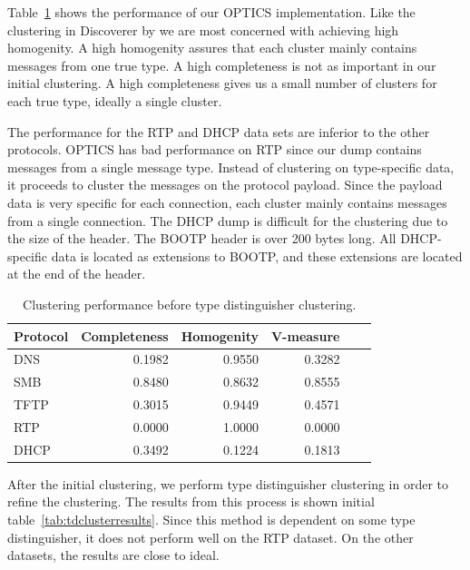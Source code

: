 \documentclass[a4paper]{report}
\begin{document}
Table~\ref{tab:initclusterresults} shows the performance of our OPTICS
implementation. Like the clustering in Discoverer by \citeauthor{cui07} we
are most concerned with achieving high homogenity. A high homogenity assures
that each cluster mainly contains messages from one true type. A high
completeness is not as important in our initial clustering. A high completeness
gives us a small number of clusters for each true type, ideally a single
cluster.

The performance for the RTP and DHCP data sets are inferior to the other
protocols. OPTICS has bad performance on RTP since our dump contains messages
from a single message type. Instead of clustering on type-specific data, it
proceeds to cluster the messages on the protocol payload. Since the payload
data is very specific for each connection, each cluster mainly contains
messages from a single connection. The DHCP dump is difficult for the
clustering due to the size of the header. The BOOTP header is over 200 bytes
long. All DHCP-specific data is located as extensions to BOOTP, and these
extensions are located at the end of the header.

\begin{table}[h]
    \centering
    \captionsetup{width=0.8\textwidth}
    \caption{Clustering performance before type distinguisher clustering.}
    \begin{tabular}{| l | r | r | r | r | r |}
        \hline
        \textbf{Protocol}&\textbf{Completeness}&\textbf{Homogenity}&\textbf{V-measure} \\ \hline
        DNS & 0.1982 & 0.9550 & 0.3282 \\ \hline
        SMB & 0.8480 & 0.8632 & 0.8555 \\ \hline
        TFTP & 0.3015 & 0.9449 & 0.4571 \\ \hline
        RTP & 0.0000 & 1.0000 & 0.0000 \\ \hline
        DHCP & 0.3492 & 0.1224 & 0.1813 \\ \hline
    \end{tabular}
    \label{tab:initclusterresults}
\end{table}

After the initial clustering, we perform type distinguisher clustering in order
to refine the clustering. The results from this process is shown initial
table~\ref{tab:tdclusterresults}. Since this method is dependent on some
type distinguisher, it does not perform well on the RTP dataset. On the
other datasets, the results are close to ideal.
\end{document}
